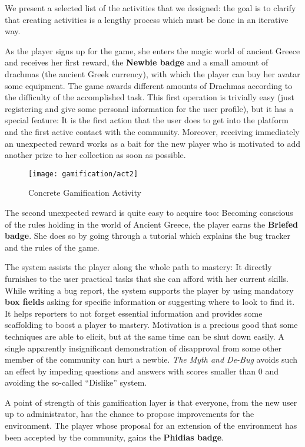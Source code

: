 We present a selected list of the activities that we designed: the goal is to clarify that creating activities is a lengthy process which must be done in an iterative way.

 As the player signs up for the game, she enters the magic world of ancient Greece and receives her first reward, the \textbf{Newbie badge} and a small amount of drachmas (the ancient Greek currency), with which the player can buy her avatar some equipment.
The game awards different amounts of Drachmas according to the difficulty of the accomplished task.
This first operation is trivially easy (just registering and give some personal information for the user profile), but it has a special feature: It is the first action that the user does to get into the platform and the first active contact with the community.
Moreover, receiving immediately an unexpected reward works as a bait for the new player who is motivated to add another prize to her collection as soon as possible.

\begin{figure}[t]
\centering
\texttt{[image: gamification/act2]}
\caption{Concrete Gamification Activity}
\label{fig-act2}
\end{figure}

 The second unexpected reward is quite easy to acquire too: Becoming conscious of the rules holding in the world of Ancient Greece, the player earns the \textbf{Briefed badge}.
She does so by going through a tutorial which explains the bug tracker and the rules of the game.

The system assists the player along the whole path to mastery: It directly furnishes to the user practical tasks that she can afford with her current skills.
While writing a bug report, the system supports the player by using mandatory \textbf{box fields} asking for specific information or suggesting where to look to find it.
It helps reporters to not forget essential information and provides some scaffolding to boost a player to mastery.
Motivation is a precious good that some techniques are able to elicit, but at the same time can be shut down easily.
A single apparently insignificant demonstration of disapproval from some other member of the community can hurt a newbie.
\textit{The Myth and De-Bug} avoids such an effect by impeding questions and answers with scores smaller than 0 and avoiding the so-called ``Dislike'' system.

 A point of strength of this gamification layer is that everyone, from the new user up to administrator, has the chance to propose improvements for the  environment.
The player whose proposal for an extension of the environment has been accepted by the community, gains the \textbf{Phidias badge}.


